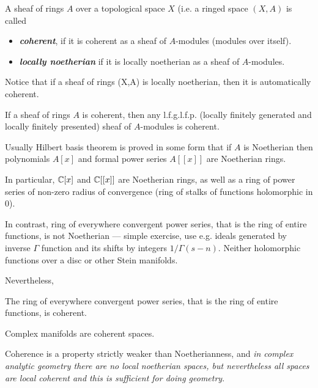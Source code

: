\begin{defn}
	A sheaf of rings $A$ over a topological space $X$ (i.e.  a ringed space $(X,A)$ is called
	
	\begin{itemize}
		\item  \textbf{\textit{coherent}}, if it is coherent as a sheaf of $A$-modules (modules over itself).
		
		\item  \textbf{\textit{locally noetherian}} if it is locally noetherian as a sheaf of $A$-modules.
	\end{itemize}
\end{defn}
Notice that if a sheaf of rings (X,A) is locally noetherian, then  it is automatically coherent.
\begin{prop}
	If a sheaf of rings $A$ is coherent, then any l.f.g.l.f.p. (locally finitely generated and locally finitely presented) sheaf of $A$-modules is coherent.
\end{prop}
\begin{remark}
	Usually Hilbert basis theorem is proved in some form that if $A$ is Noetherian then polynomials $A[x]$ and formal power series $A[[x]]$ are Noetherian rings.
	
	In particular, $\mathbb{C}[x]$ and $\mathbb{C}[[x]]$ are Noetherian rings, as well as a ring of power series of non-zero radius of convergence (ring of stalks of functions holomorphic in 0).
\end{remark}
\begin{exercise}
	In contrast, ring of everywhere convergent power series, that is the ring of entire functions, is not Noetherian — simple exercise, use e.g. ideals generated by inverse $\Gamma$ function and its shifts by integers $1/\Gamma(s-n)$. Neither holomorphic functions over a disc or other Stein manifolds.
\end{exercise}
Nevertheless, 
\begin{thm}
	The ring of everywhere convergent power series, that is the ring of entire functions, is coherent.
\end{thm}
\begin{coro}
	Complex manifolds are coherent spaces.
\end{coro}
Coherence is a property strictly weaker than Noetherianness, and \textit{in complex analytic geometry there are no local noetherian spaces, but nevertheless all spaces are local coherent and this is sufficient for doing geometry}.

